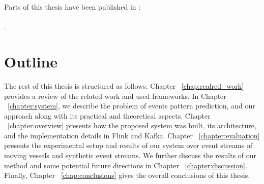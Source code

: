 Parts of this thesis have been published in \cite{Qadah}:\\ \\
.

\section{Outline }

\par The rest of this thesis is structured as follows. Chapter ~\ref{chap:realred_work} provides a review  of the related work and used frameworks. In Chapter ~\ref{chapter:system}, we describe the problem of events pattern prediction, and our approach along with its practical and theoretical aspects.
 Chapter ~\ref{chapter:overview} presents how the proposed system was built, its architecture,  and the implementation details in Flink and Kafka.
 Chapter ~\ref{chapter:evaluation} presents the experimental setup and results of our system over event streams of moving vessels and synthetic event streams. We further
  discuss the results of our method and some potential future directions in Chapter ~\ref{chapter:discussion}. Finally, Chapter ~\ref{chap:conclusions} gives the overall conclusions of this thesis. 
	







